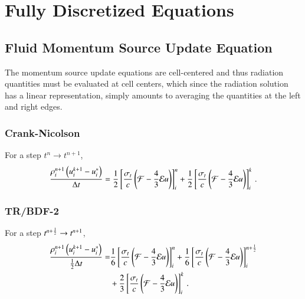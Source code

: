 \section{Fully Discretized Equations}
\subsection{Fluid Momentum Source Update Equation}
The momentum source update equations are cell-centered and thus
radiation quantities must be evaluated at cell centers, which
since the radiation solution has a linear representation, simply
amounts to averaging the quantities at the left and right edges.

\subsubsection{Crank-Nicolson}
For a step $t^n\rightarrow t^{n+1}$,
\begin{equation}
  \frac{\rho_i^{n+1}\left(u_i^{k+1}-u_i^*\right)}{\dt} = 
   \half\left[\frac{\sigma_{t}}{c}\left(\F-\frac{4}{3}\E u\right)\right]_i^n
  +\half\left[\frac{\sigma_{t}}{c}\left(\F-\frac{4}{3}\E u\right)\right]_i^k
  \pep
\lequ{hydromCNfull}
\end{equation}

\subsubsection{TR/BDF-2}
For a step $t^{n+\frac{1}{2}}\rightarrow t^{n+1}$,
\begin{equation}\begin{split}
  \frac{\rho_i^{n+1}\left(u_i^{k+1}-u_i^*\right)}{\half\dt} =  
  & \sixth\left[\frac{\sigma_{t}}{c}\left(\F-\frac{4}{3}\E u\right)\right]_i^n
   +\sixth\left[\frac{\sigma_{t}}{c}\left(\F-\frac{4}{3}\E u\right)\right]_i^{n+\half}\\
  &+\frac{2}{3}\left[\frac{\sigma_t}{c}\left(\F-\frac{4}{3}\E u\right)\right]_i^k
  \pep
\lequ{hydromBDF2full}
\end{split}\end{equation}

